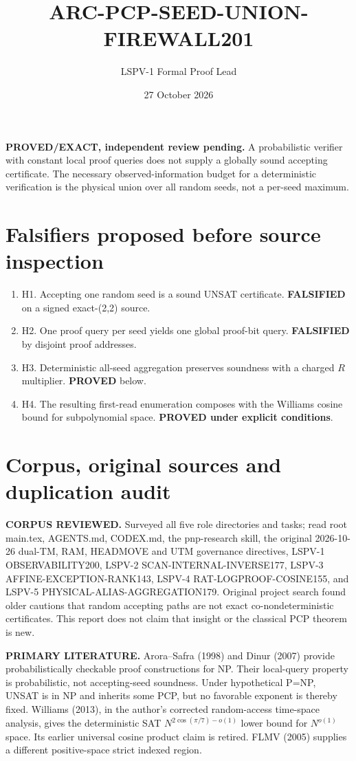 \documentclass[11pt]{article}
\title{ARC-PCP-SEED-UNION-FIREWALL201}
\author{LSPV-1 Formal Proof Lead}
\date{27 October 2026}
\begin{document}
\maketitle
\textbf{PROVED/EXACT, independent review pending.}
A probabilistic verifier with constant local proof queries does not supply a globally sound accepting certificate.
The necessary observed-information budget for a deterministic verification is the physical union over all random seeds, not a per-seed maximum.

\section{Falsifiers proposed before source inspection}
\begin{enumerate}
\item[] H1. Accepting one random seed is a sound UNSAT certificate.
\textbf{FALSIFIED} on a signed exact-(2,2) source.
\item[] H2. One proof query per seed yields one global proof-bit query.
\textbf{FALSIFIED} by disjoint proof addresses.
\item[] H3. Deterministic all-seed aggregation preserves soundness with a charged $R$ multiplier. \textbf{PROVED} below.
\item[] H4. The resulting first-read enumeration composes with the Williams cosine bound for subpolynomial space. \textbf{PROVED under explicit conditions}.
\end{enumerate}

\section{Corpus, original sources and duplication audit}
\textbf{CORPUS REVIEWED.} Surveyed all five role directories and tasks;
read root main.tex, AGENTS.md, CODEX.md, the pnp-research skill,
the original 2026-10-26 dual-TM, RAM, HEADMOVE and UTM governance directives,
LSPV-1 OBSERVABILITY200, LSPV-2 SCAN-INTERNAL-INVERSE177,
LSPV-3 AFFINE-EXCEPTION-RANK143, LSPV-4 RAT-LOGPROOF-COSINE155,
and LSPV-5 PHYSICAL-ALIAS-AGGREGATION179. Original project
search found older cautions that random accepting paths are not exact
co-nondeterministic certificates. This report does not claim that insight
or the classical PCP theorem is new.

\textbf{PRIMARY LITERATURE.} Arora--Safra (1998) and Dinur (2007)
provide probabilistically checkable proof constructions for NP.
Their local-query property is probabilistic, not accepting-seed soundness.
Under hypothetical P=NP, UNSAT is in NP and inherits some PCP, but
no favorable exponent is thereby fixed. Williams (2013), in the
author's corrected random-access time-space analysis, gives the
deterministic SAT $N^{2\cos(\pi/7)-o(1)}$ lower bound for
$N^{o(1)}$ space. Its earlier universal cosine product claim is retired.
FLMV (2005) supplies a different positive-space strict indexed region.
\end{document}
